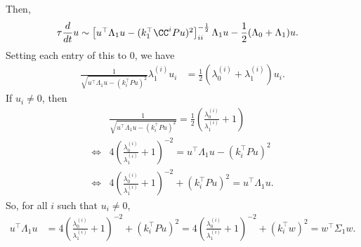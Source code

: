 \documentclass{article}
\begin{document}
Then,
\begin{align*}
  \tau \frac{d}{dt} u
  &\sim \begin{bmatrix} u^\top \Lambda_1 u - ( k_1^\top \CC^i P u )^2 \end{bmatrix}_{ii}^{-\frac{1}{2}} \Lambda_1 u - \frac{1}{2} ( \Lambda_0 + \Lambda_1 ) u.
\end{align*}
Setting each entry of this to 0, we have
\begin{align*}
  \frac{ 1 }{ \sqrt{ u^\top \Lambda_1 u - ( k_i^\top P u )^2 } } \lambda_1^{(i)} u_i &= \frac{1}{2} (\lambda_0^{(i)} + \lambda_1^{(i)}) u_i.
\end{align*}
If $u_i \neq 0$, then
\begin{align*}
  &\frac{ 1 }{ \sqrt{ u^\top \Lambda_1 u - ( k_i^\top P u )^2 } } = \frac{1}{2} \left( \frac{\lambda_0^{(i)}}{\lambda_1^{(i)} } + 1 \right) \\
  \iff &4 \left( \frac{\lambda_0^{(i)}}{\lambda_1^{(i)} } + 1 \right)^{-2} = u^\top \Lambda_1 u - ( k_i^\top P u )^2 \\
  \iff &4 \left( \frac{\lambda_0^{(i)}}{\lambda_1^{(i)} } + 1 \right)^{-2} + ( k_i^\top P u )^2 = u^\top \Lambda_1 u.
\end{align*}
So, for all $i$ such that $u_i \neq 0$,
\begin{align*}
  u^\top \Lambda_1 u
  &= 4 \left( \frac{\lambda_0^{(i)}}{\lambda_1^{(i)} } + 1 \right)^{-2} + ( k_i^\top P u )^2
  = 4 \left( \frac{\lambda_0^{(i)}}{\lambda_1^{(i)} } + 1 \right)^{-2} + ( k_i^\top w )^2
  = w^\top \Sigma_1 w.
\end{align*}







\end{document}
